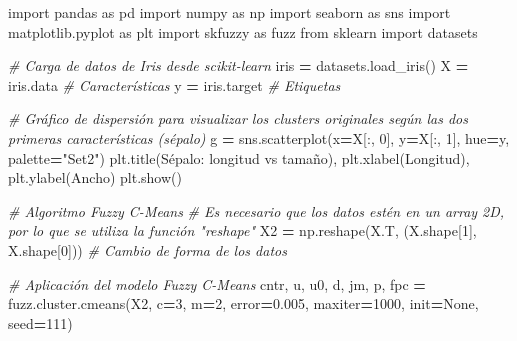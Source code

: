 \documentclass[
  a4paper,
  DIV=11,
  numbers=noendperiod]{scrreprt}
\newenvironment{Shaded}{\begin{snugshade}}{\end{snugshade}}
\newcommand{\CommentTok}[1]{\textcolor[rgb]{0.56,0.35,0.01}{\textit{#1}}}
\newcommand{\DecValTok}[1]{\textcolor[rgb]{0.00,0.00,0.81}{#1}}
\newcommand{\FloatTok}[1]{\textcolor[rgb]{0.00,0.00,0.81}{#1}}
\newcommand{\ImportTok}[1]{#1}
\newcommand{\NormalTok}[1]{#1}
\newcommand{\OperatorTok}[1]{\textcolor[rgb]{0.81,0.36,0.00}{\textbf{#1}}}
\newcommand{\StringTok}[1]{\textcolor[rgb]{0.31,0.60,0.02}{#1}}
\newcommand{\VariableTok}[1]{\textcolor[rgb]{0.00,0.00,0.00}{#1}}
\begin{document}
\begin{Shaded}
\begin{Highlighting}[numbers=left,,]
\ImportTok{import}\NormalTok{ pandas }\ImportTok{as}\NormalTok{ pd}
\ImportTok{import}\NormalTok{ numpy }\ImportTok{as}\NormalTok{ np}
\ImportTok{import}\NormalTok{ seaborn }\ImportTok{as}\NormalTok{ sns}
\ImportTok{import}\NormalTok{ matplotlib.pyplot }\ImportTok{as}\NormalTok{ plt}
\ImportTok{import}\NormalTok{ skfuzzy }\ImportTok{as}\NormalTok{ fuzz}
\ImportTok{from}\NormalTok{ sklearn }\ImportTok{import}\NormalTok{ datasets}

\CommentTok{\# Carga de datos de Iris desde scikit{-}learn}
\NormalTok{iris }\OperatorTok{=}\NormalTok{ datasets.load\_iris()}
\NormalTok{X }\OperatorTok{=}\NormalTok{ iris.data  }\CommentTok{\# Características}
\NormalTok{y }\OperatorTok{=}\NormalTok{ iris.target  }\CommentTok{\# Etiquetas}

\CommentTok{\# Gráfico de dispersión para visualizar los clusters originales según las dos primeras características (sépalo)}
\NormalTok{g }\OperatorTok{=}\NormalTok{ sns.scatterplot(x}\OperatorTok{=}\NormalTok{X[:, }\DecValTok{0}\NormalTok{], y}\OperatorTok{=}\NormalTok{X[:, }\DecValTok{1}\NormalTok{], hue}\OperatorTok{=}\NormalTok{y, palette}\OperatorTok{=}\StringTok{"Set2"}\NormalTok{)}
\NormalTok{plt.title(}\StringTok{\textquotesingle{}Sépalo: longitud vs tamaño\textquotesingle{}}\NormalTok{), plt.xlabel(}\StringTok{\textquotesingle{}Longitud\textquotesingle{}}\NormalTok{), plt.ylabel(}\StringTok{\textquotesingle{}Ancho\textquotesingle{}}\NormalTok{)}
\NormalTok{plt.show()}

\CommentTok{\# Algoritmo Fuzzy C{-}Means}
\CommentTok{\# Es necesario que los datos estén en un array 2D, por lo que se utiliza la función "reshape"}
\NormalTok{X2 }\OperatorTok{=}\NormalTok{ np.reshape(X.T, (X.shape[}\DecValTok{1}\NormalTok{], X.shape[}\DecValTok{0}\NormalTok{]))  }\CommentTok{\# Cambio de forma de los datos}

\CommentTok{\# Aplicación del modelo Fuzzy C{-}Means}
\NormalTok{cntr, u, u0, d, jm, p, fpc }\OperatorTok{=}\NormalTok{ fuzz.cluster.cmeans(X2, c}\OperatorTok{=}\DecValTok{3}\NormalTok{, m}\OperatorTok{=}\DecValTok{2}\NormalTok{, error}\OperatorTok{=}\FloatTok{0.005}\NormalTok{, maxiter}\OperatorTok{=}\DecValTok{1000}\NormalTok{, init}\OperatorTok{=}\VariableTok{None}\NormalTok{, seed}\OperatorTok{=}\DecValTok{111}\NormalTok{)}
\end{Highlighting}
\end{Shaded}
\end{document}
